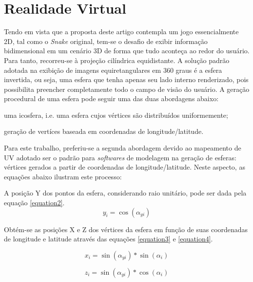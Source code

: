\documentclass[conference]{IEEEtran}
\begin{document}
\section{Realidade Virtual} \label{sec:invertedsphere}
Tendo em vista que a proposta deste artigo contempla um jogo essencialmente 2D, tal como o \textit{Snake} original, tem-se o desafio de exibir informação bidimensional em um cenário 3D de forma que tudo aconteça ao redor do usuário. Para tanto, recorreu-se à projeção cilíndrica equidistante. A solução padrão adotada na exibição de imagens equiretangulares em 360 graus é a esfera invertida, ou seja, uma esfera que tenha apenas seu lado interno renderizado, pois possibilita preencher completamente todo o campo de visão do usuário. A geração procedural de uma esfera pode seguir uma das duas abordagens abaixo:
\begin{enumerate}
  \begin{item} uma icosfera, i.e. uma esfera cujos vértices são distribuídos uniformemente; \end{item}
  \begin{item} geração de vertíces baseada em coordenadas de longitude/latitude. \end{item}
\end{enumerate}

Para este trabalho, preferiu-se a segunda abordagem devido ao mapeamento de UV adotado ser o padrão para \textit{softwares} de modelagem na geração de esferas: vértices gerados a partir de coordenadas de longitude/latitude. Neste aspecto, as equações abaixo ilustram este processo:


A posição Y dos pontos da esfera, considerando raio unitário, pode ser dada pela equação \ref{equation2}.
\begin{equation}
y_{i} = \cos(\alpha_{yi})
\label{equation2}
\end{equation}

Obtém-se as posições X e Z dos vértices da esfera em função de suas coordenadas de longitude e latitude através das equações \ref{equation3} e \ref{equation4}.

\begin{equation}
x_{i} = \sin(\alpha_{yi}) * \sin(\alpha_i)
\label{equation3}
\end{equation}

\begin{equation}
z_{i} = \sin(\alpha_{yi}) * \cos(\alpha_i)
\label{equation4}
\end{equation}
\end{document}
